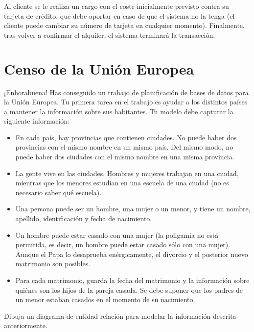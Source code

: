 \documentclass[a4paper]{article}
\begin{document}
Al cliente se le realiza un cargo con el coste inicialmente previsto contra su tarjeta de crédito, que debe aportar en caso de que el sistema no la tenga (el cliente puede cambiar su número de tarjeta en cualquier momento). Finalmente, tras volver a confirmar el alquiler, el sistema terminará la transacción.

\section{Censo de la Unión Europea}
¡Enhorabuena! Has conseguido un trabajo de planificación de bases de datos para la Unión Europea. Tu primera tarea en el trabajo es ayudar a los distintos países a mantener la información sobre sus habitantes. Tu modelo debe capturar la siguiente información:
\begin{itemize}
    \item En cada país, hay provincias que contienen ciudades. No puede haber dos provincias con el mismo nombre en un mismo país. Del mismo modo, no puede haber dos ciudades con el mismo nombre en una misma provincia.
    \item La gente vive en las ciudades. Hombres y mujeres trabajan en una ciudad, mientras que los menores estudian en una escuela de una ciudad (no es necesario saber qué escuela).
    \item Una persona puede ser un hombre, una mujer o un menor, y tiene un nombre, apellido, identificación y fecha de nacimiento.
    \item Un hombre puede estar casado con una mujer (la poligamia no está permitida, es decir, un hombre puede estar casado sólo con una mujer). Aunque el Papa lo desaprueba enérgicamente, el divorcio y el posterior nuevo matrimonio son posibles.
    \item Para cada matrimonio, guarda la fecha del matrimonio y la información sobre quiénes son los hijos de la pareja casada. Se debe suponer que los padres de un menor estaban casados en el momento de su nacimiento.
\end{itemize}

Dibuja un diagrama de entidad-relación para modelar la información descrita anteriormente.
\end{document}
